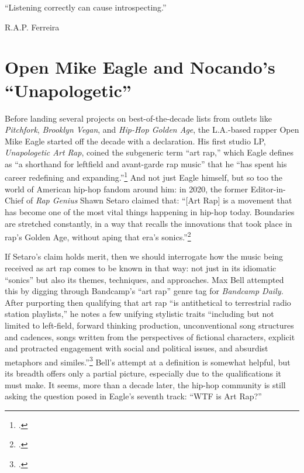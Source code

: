 \onehalfspacing

\epigraph{{``Listening correctly can cause introspecting.''}}{R.A.P. Ferreira}

\section{Open Mike Eagle and Nocando's ``Unapologetic''}

Before landing several projects on best-of-the-decade lists from outlets like \textit{Pitchfork},
\textit{Brooklyn Vegan}, and \textit{Hip-Hop Golden Age}, the L.A.-based rapper Open Mike Eagle 
started off the decade with a declaration. His first studio LP, \textit{Unapologetic Art Rap}, coined
the subgeneric term ``art rap,'' which Eagle defines as ``a shorthand for leftfield and avant-garde rap 
music'' that he ``has spent his career redefining and expanding.''\footnote{
    \cite{openmikeeagle}.}
And not just Eagle himself, but so too the world of American hip-hop fandom around him: in 2020, the 
former Editor-in-Chief of \textit{Rap Genius} Shawn Setaro claimed that: ``[Art Rap] is a movement that
has become one of the most vital things happening in hip-hop today. Boundaries are stretched constantly,
in a way that recalls the innovations that took place in rap's Golden Age, without aping that era's 
sonics.''\footnote{\cite{shawnsetaroWhyYouShould2020}.}

If Setaro's claim holds merit, then we should interrogate how the music being received as art rap comes
to be known in that way: not just in its idiomatic ``sonics'' but also its themes, techniques, and 
approaches. Max Bell attempted this by digging through Bandcamp's ``art rap'' genre tag for 
\textit{Bandcamp  Daily.} After purporting then qualifying that art rap ``is antithetical to 
terrestrial radio station playlists,'' he notes a few unifying stylistic traits ``including but not limited
to left-field, forward thinking production, unconventional song structures and cadences, songs written 
from the perspectives of fictional characters, explicit and protracted engagement with social and political
issues, and absurdist metaphors and similes.''\footnote{
    \cite{maxbellWalkAvantGardeWorld2017}.} 
Bell's attempt at a definition is somewhat helpful, but its breadth offers only a partial picture, especially
due to the qualifications it must make. It seems, more than a decade later, the hip-hop community is still 
asking the question posed in Eagle's seventh track: ``WTF is Art Rap?''

